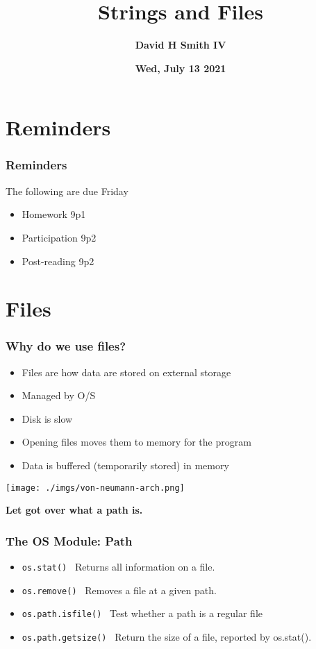 \documentclass{beamer}
\title{\textbf{Strings and Files}}
\author{\textbf{David H Smith IV}}
\institute[\textbf{UIUC}]{\textbf{University of Illinois Urbana-Champaign}}
\date{\textbf{Wed, July 13 2021}}
\begin{document}
\frame{\titlepage}

\section{Reminders}

%
%
\begin{frame}
  \frametitle{Reminders}
  The following are due Friday
  \begin{itemize}
    \item Homework 9p1
    \item Participation 9p2
    \item Post-reading 9p2
  \end{itemize}
\end{frame}

\section{Files}
%
%
\begin{frame}[fragile]
  \frametitle{Why do we use files?}
  \begin{minipage}{0.48\textwidth}
    \begin{itemize}
      \item Files are how data are stored on external storage
      \item Managed by O/S
      \item Disk is slow
      \item Opening files moves them to memory for the program
      \item Data is buffered (temporarily stored) in memory
    \end{itemize}
  \end{minipage}
  \hfill
  \begin{minipage}{0.48\textwidth}
    \centering
    \texttt{[image: ./imgs/von-neumann-arch.png]}
    \vfill
  \end{minipage}
  \pause
  \vfill
  \textbf{Let got over what a path is.}
\end{frame}

\begin{frame}[fragile]
  \frametitle{The OS Module: Path}
  \begin{itemize}
    \item \lstinline|os.stat()| \textrightarrow \ Returns all information on a file.
    \item \lstinline|os.remove()| \textrightarrow \ Removes a file at a given path.
    \item \lstinline|os.path.isfile()| \textrightarrow \ Test whether a path is a regular file
    \item \lstinline|os.path.getsize()| \textrightarrow \ Return the size of a file, reported by os.stat().
  \end{itemize}
\end{frame}
\end{document}
